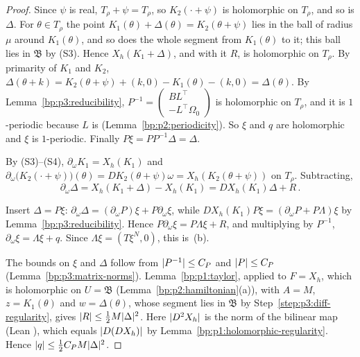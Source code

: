 \begin{proof}
\label{step:p3:diff-regularity}
Since $\psi$ is real, $T_\rho+\psi=T_\rho$, so $K_2(\cdot+\psi)$ is holomorphic on $T_\rho$, and so is
$\Delta$. For $\theta\in T_\rho$ the point $K_1(\theta)+\Delta(\theta)=K_2(\theta+\psi)$ lies in the ball
of radius $\mu$ around $K_1(\theta)$, and so does the whole segment from $K_1(\theta)$ to it; this ball
lies in $\mathfrak B$ by (S3). Hence $X_h(K_1+\Delta)$, and with it $R$, is holomorphic on $T_\rho$. By
primarity of $K_1$ and $K_2$, $\Delta(\theta+k)=K_2(\theta+\psi)+(k,0)-K_1(\theta)-(k,0)=\Delta(\theta)$.
By Lemma~\ref{bp:p3:reducibility}, $P^{-1}=\left(\begin{smallmatrix}BL^\top\\-L^\top\Omega_0
\end{smallmatrix}\right)$ is holomorphic on $T_\rho$, and it is $1$-periodic because $L$ is
(Lemma~\ref{bp:p2:periodicity}). So $\xi$ and $q$ are holomorphic and $\xi$ is $1$-periodic. Finally $P\xi=PP^{-1}\Delta=\Delta$.

\label{step:p3:diff-linearized}
By (S3)--(S4), $\partial_\omega K_1=X_h(K_1)$ and $\partial_\omega\bigl(K_2(\cdot+\psi)\bigr)(\theta)
=DK_2(\theta+\psi)\omega=X_h(K_2(\theta+\psi))$ on $T_\rho$. Subtracting,
\begin{equation*}
\partial_\omega\Delta=X_h(K_1+\Delta)-X_h(K_1)=DX_h(K_1)\Delta+R\,.
\end{equation*}

\label{step:p3:diff-triangular}
Insert $\Delta=P\xi$: $\partial_\omega\Delta=(\partial_\omega P)\xi+P\partial_\omega\xi$, while
$DX_h(K_1)P\xi=(\partial_\omega P+P\Lambda)\xi$ by Lemma~\ref{bp:p3:reducibility}. Hence
$P\partial_\omega\xi=P\Lambda\xi+R$, and multiplying by $P^{-1}$, $\partial_\omega\xi=\Lambda\xi+q$.
Since $\Lambda\xi=(T\xi^N,0)$, this is~(b).

\label{step:p3:diff-bounds}
The bounds on $\xi$ and $\Delta$ follow from $\lvert P^{-1}\rvert\le C_P$ and $\lvert P\rvert\le C_P$
(Lemma~\ref{bp:p3:matrix-norms}). Lemma~\ref{bp:p1:taylor}, applied to $F=X_h$, which is holomorphic on
$U=\mathfrak B$ (Lemma~\ref{bp:p2:hamiltonian}(a)), with $A=M$, $z=K_1(\theta)$ and $w=\Delta(\theta)$, whose
segment lies in $\mathfrak B$ by Step~\ref{step:p3:diff-regularity}, gives $\lvert R\rvert\le\frac12M\lvert \Delta\rvert^2$.
Here $\lvert D^2X_h\rvert$ is the norm of the bilinear map (Lean ), which equals
$\lvert D(DX_h)\rvert$ by Lemma~\ref{bp:p1:holomorphic-regularity}. Hence $\lvert q\rvert\le\frac12C_PM\lvert \Delta\rvert^2$.
\end{proof}

